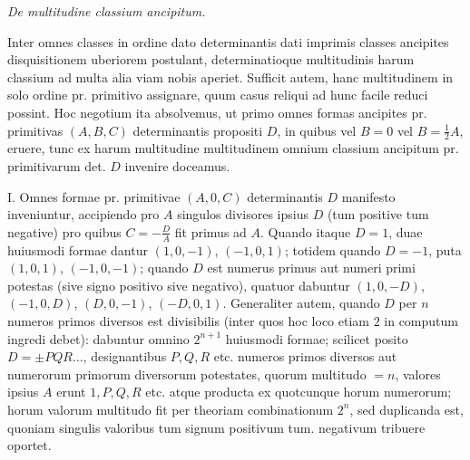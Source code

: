 \begin{center}
\textit{De multitudine classium ancipitum.}
\end{center}

Inter omnes classes in ordine dato determinantis dati imprimis classes ancipites disquisitionem uberiorem postulant, determinatioque multitudinis harum classium ad multa alia viam nobis aperiet. Sufficit autem, hanc multitudinem in solo ordine pr. primitivo assignare, quum casus reliqui ad hunc facile reduci possint. Hoc negotium ita absolvemus, ut primo omnes formas ancipites pr. primitivas \((A,B,C)\) determinantis propositi \(D\), in quibus vel \(B=0\) vel \(B=\frac12 A\), eruere, tunc ex harum multitudine multitudinem omnium classium ancipitum pr. primitivarum det. \(D\) invenire doceamus.

I. Omnes formae pr. primitivae \((A,0,C)\) determinantis \(D\) manifesto inveniuntur, accipiendo pro \(A\) singulos divisores ipsius \(D\) (tum positive tum negative) pro quibus \(C=-\frac{D}{A}\) fit primus ad \(A\). Quando itaque \(D=1\), duae huiusmodi formae dantur \((1,0,-1)\), \((-1,0,1)\); totidem quando \(D=-1\), puta \((1,0,1)\), \((-1,0,-1)\); quando \(D\) est numerus primus aut numeri primi potestas (sive signo positivo sive negativo), quatuor dabuntur \((1,0,-D)\), \((-1,0,D)\), \((D,0,-1)\), \((-D,0,1)\). Generaliter autem, quando \(D\) per \(n\) numeros primos diversos est divisibilis (inter quos hoc loco etiam \(2\) in computum ingredi debet): dabuntur omnino \(2^{n+1}\) huiusmodi formae; scilicet posito \(D=\pm PQR\ldots\), designantibus \(P,Q,R\) etc. numeros primos diversos aut numerorum primorum diversorum potestates, quorum multitudo \(=n\), valores ipsius \(A\) erunt \(1,P,Q,R\) etc. atque producta ex quotcunque horum numerorum; horum valorum multitudo fit per theoriam combinationum \(2^n\), sed duplicanda est, quoniam singulis valoribus tum signum positivum tum. negativum tribuere oportet.

